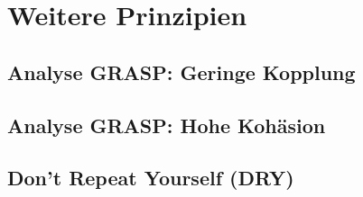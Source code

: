 \chapter{Weitere Prinzipien}

\section{Analyse GRASP: Geringe Kopplung}

\section{Analyse GRASP: Hohe Kohäsion}

\section{Don't Repeat Yourself (DRY)}